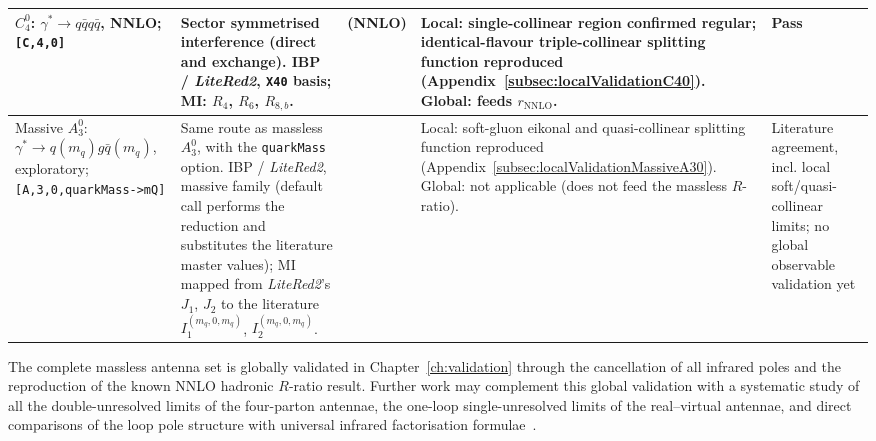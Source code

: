 {\begin{center}
\begin{longtable}{|>{\raggedright\arraybackslash}p{2.5cm}|>{\raggedright\arraybackslash}p{4.0cm}|>{\raggedright\arraybackslash}p{1.9cm}|>{\raggedright\arraybackslash}p{3.2cm}|>{\raggedright\arraybackslash}p{1.9cm}|}
$C_4^0$: $\gamma^*\to q\bar q q\bar q$, NNLO; \texttt{[C,4,0]} & Sector symmetrised interference (direct and exchange). IBP / \textit{LiteRed2}, \texttt{X40} basis; MI: $R_4$, $R_6$, $R_{8,b}$. & \cite{Gehrmann-DeRidder:2005btv} (NNLO) & Local: single-collinear region confirmed regular; identical-flavour triple-collinear splitting function reproduced (Appendix~\ref{subsec:localValidationC40}). Global: feeds $r_\text{NNLO}$. & Pass \\ \hline
Massive $A_3^0$: $\gamma^*\to q(m_q)g\bar q(m_q)$, exploratory; \texttt{[A,3,0,\allowbreak quarkMass->\allowbreak mQ]} & Same route as massless $A_3^0$, with the \texttt{quarkMass} option. IBP / \textit{LiteRed2}, massive family (default call performs the reduction and substitutes the literature master values); MI mapped from \textit{LiteRed2}'s $J_1$, $J_2$ to the literature $I_1^{(m_q,0,m_q)}$, $I_2^{(m_q,0,m_q)}$. & \cite{GehrmannDeRidder:2009fz} & Local: soft-gluon eikonal and quasi-collinear splitting function reproduced (Appendix~\ref{subsec:localValidationMassiveA30}). Global: not applicable (does not feed the massless $R$-ratio). & Literature agreement, incl. local soft/quasi-collinear limits; no global observable validation yet \\ \hline
\end{longtable}
\end{center}
}

The complete massless antenna set is globally validated in Chapter~\ref{ch:validation} through the cancellation of all infrared poles and the reproduction of the known NNLO hadronic $R$-ratio result. Further work may complement this global validation with a systematic study of all the double-unresolved limits of the four-parton antennae, the one-loop single-unresolved limits of the real--virtual antennae, and direct comparisons of the loop pole structure with universal infrared factorisation formulae~\cite{Catani:1998bh}.


